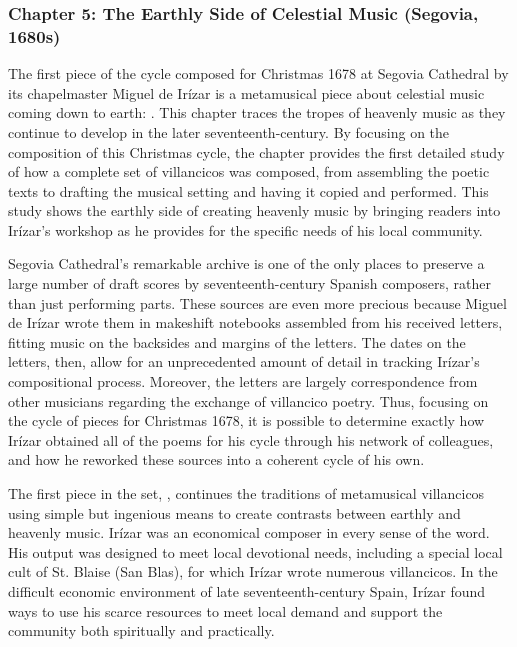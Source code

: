 \documentclass{vcbook-proposal}
\begin{document}
\subsubsection{Chapter 5: The Earthly Side of Celestial Music (Segovia, 1680s)}

The first piece of the cycle composed for Christmas 1678 at Segovia Cathedral by
its chapelmaster Miguel de Irízar is a metamusical piece about celestial music
coming down to earth: .
This chapter traces the tropes of heavenly music as they continue to develop in
the later seventeenth-century. 
By focusing on the composition of this Christmas cycle, the chapter
provides the first detailed study of how a complete set of villancicos was
composed, from assembling the poetic texts to drafting the musical setting and
having it copied and performed.
This study shows the earthly side of creating heavenly music by bringing
readers into Irízar's workshop as he provides for the specific needs of his
local community.

Segovia Cathedral's remarkable archive is one of the only places to preserve a 
large number of draft scores by seventeenth-century Spanish composers, rather 
than just performing parts.
These sources are even more precious because Miguel de Irízar wrote them in
makeshift notebooks assembled from his received letters, fitting music on the
backsides and margins of the letters.
The dates on the letters, then, allow for an unprecedented amount of detail in
tracking Irízar's compositional process.
Moreover, the letters are largely correspondence from other musicians regarding 
the exchange of villancico poetry.
Thus, focusing on the cycle of pieces for Christmas 1678, it is possible to 
determine exactly how Irízar obtained all of the poems for his cycle through 
his network of colleagues, and how he reworked these sources into a coherent 
cycle of his own.

The first piece in the set, , continues the 
traditions of metamusical villancicos using simple but ingenious means to 
create contrasts between earthly and heavenly music.
Irízar was an economical composer in every sense of the word.
His output was designed to meet local devotional needs, including a special 
local cult of St. Blaise (San Blas), for which Irízar wrote numerous 
villancicos. 
In the difficult economic environment of late seventeenth-century Spain, Irízar 
found ways to use his scarce resources to meet local demand and support the 
community both spiritually and practically.
\end{document}
